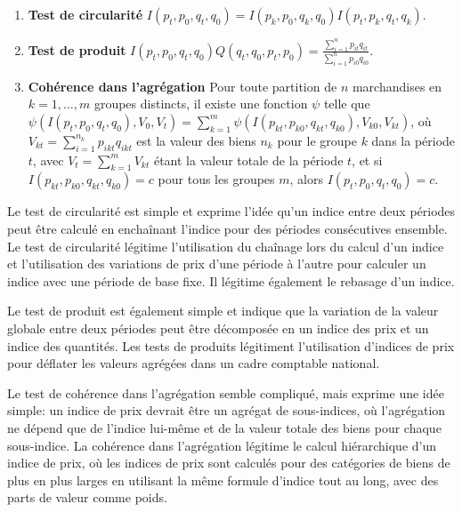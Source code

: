 \documentclass[
]{article}
\begin{document}
\begin{enumerate}
\def\labelenumi{\arabic{enumi}.}
\item
  \textbf{Test de circularité} \(I(p_{t}, p_{0}, q_{t}, q_{0}) = I(p_{k}, p_{0}, q_{k}, q_{0}) I(p_{t}, p_{k}, q_{t}, q_{k})\).
\item
  \textbf{Test de produit} \(I(p_{t}, p_{0}, q_{t}, q_{0}) Q (q_{t}, q_{0}, p_{t}, p_{0}) = \frac{\sum_{i = 1}^{n} p_{it} q_{it}} {\sum_{i = 1}^{n} p_{i0} q_{i0}}\).
\item
  \textbf{Cohérence dans l'agrégation} Pour toute partition de \(n\) marchandises en \(k = 1, \ldots, m\) groupes distincts, il existe une fonction \(\psi\) telle que \(\psi (I(p_{t }, p_{0}, q_{t}, q_{0}), V_{0}, V_{t}) = \sum_{k = 1}^{m} \psi (I(p_{kt}, p_{k0}, q_{kt}, q_{k0}), V_{k0}, V_{kt})\), où \(V_{kt} = \sum_{i = 1}^{n_{k}} p_{ikt} q_{ikt}\) est la valeur des biens \(n_{k}\) pour le groupe \(k\) dans la période \(t\), avec \(V_{t} = \sum_{k = 1}^{m} V_{kt}\) étant la valeur totale de la période \(t\), et si \(I(p_{kt}, p_{k0}, q_{kt}, q_{k0}) = c\) pour tous les groupes \(m\), alors \(I(p_{t}, p_{0}, q_{t}, q_{0}) = c\).
\end{enumerate}

Le test de circularité est simple et exprime l'idée qu'un indice entre deux périodes peut être calculé en enchaînant l'indice pour des périodes consécutives ensemble. Le test de circularité légitime l'utilisation du chaînage lors du calcul d'un indice et l'utilisation des variations de prix d'une période à l'autre pour calculer un indice avec une période de base fixe. Il légitime également le rebasage d'un indice.

Le test de produit est également simple et indique que la variation de la valeur globale entre deux périodes peut être décomposée en un indice des prix et un indice des quantités. Les tests de produits légitiment l'utilisation d'indices de prix pour déflater les valeurs agrégées dans un cadre comptable national.

Le test de cohérence dans l'agrégation semble compliqué, mais exprime une idée simple: un indice de prix devrait être un agrégat de sous-indices, où l'agrégation ne dépend que de l'indice lui-même et de la valeur totale des biens pour chaque sous-indice. La cohérence dans l'agrégation légitime le calcul hiérarchique d'un indice de prix, où les indices de prix sont calculés pour des catégories de biens de plus en plus larges en utilisant la même formule d'indice tout au long, avec des parts de valeur comme poids.
\end{document}
